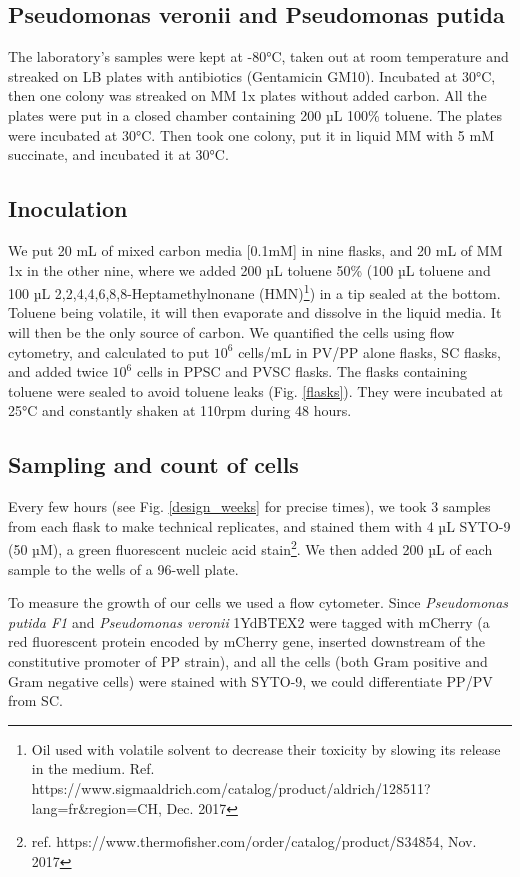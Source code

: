 \documentclass[a4paper, 10pt, conference]{ieeeconf}   %
\begin{document}
\subsection{Pseudomonas veronii and Pseudomonas putida}
The laboratory's samples were kept at -80°C, taken out at room temperature and streaked on LB plates with antibiotics (Gentamicin GM10). Incubated at 30°C, then one colony was streaked on MM 1x plates without added carbon. All the plates were put in a closed chamber containing 200 µL 100\% toluene. The plates were incubated at 30°C. Then took one colony, put it in liquid MM with 5 mM succinate, and incubated it at 30°C.

\subsection{Inoculation}
We put 20 mL of mixed carbon media [0.1mM] in nine flasks, and 20 mL of MM 1x in the other nine, where we added 200 µL toluene  50\% (100 µL toluene and 100 µL 2,2,4,4,6,8,8-Heptamethylnonane (HMN)\footnote{Oil used with volatile solvent to decrease their toxicity by slowing its release in the medium. Ref. https://www.sigmaaldrich.com/catalog/product/aldrich/128511?lang\linebreak[0]=fr\&region=CH, Dec. 2017}) in a tip sealed at the bottom. Toluene being volatile, it will then evaporate and dissolve in the liquid media. It will then be the only source of carbon. We quantified the cells using flow cytometry, and calculated to put $10^{6}$ cells/mL in PV/PP alone flasks, SC flasks, and added twice $10^{6}$ cells in PPSC and PVSC flasks. The flasks containing toluene were sealed to avoid toluene leaks (Fig. \ref{flasks}).
They were incubated at 25°C and constantly shaken at 110rpm during 48 hours.

\subsection{Sampling and count of cells}
Every few hours (see Fig. \ref{design_weeks} for precise times), we took 3 samples from each flask to make technical replicates, and stained them with 4 µL SYTO-9 (50 µM), a  green fluorescent nucleic acid stain\footnote{ref. https://www.thermofisher.com/order/catalog/product/S34854, Nov. 2017}.  We then added 200 µL of each sample to the wells of a 96-well plate.

To measure the growth of our cells we used a flow cytometer. 
Since \textit{Pseudomonas putida F1} and \textit{Pseudomonas veronii} 1YdBTEX2 were tagged with mCherry (a red fluorescent protein encoded by mCherry gene, inserted downstream of the constitutive promoter of PP strain), and all the cells (both Gram positive and Gram negative cells) were stained with SYTO-9, we could differentiate PP/PV from SC. 
%  
\end{document}
